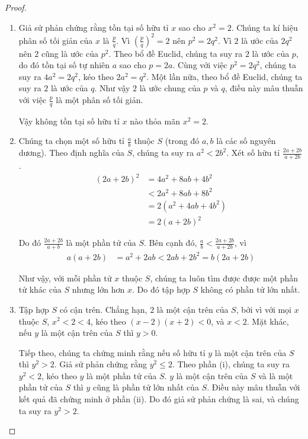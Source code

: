 \begin{proof}
	\begin{enumerate}[label={(\roman*)}]
		\item Giả sử phản chứng rằng tồn tại số hữu tỉ $x$ sao cho $x^{2} = 2$. Chúng ta kí hiệu phân số tối giản của $x$ là $\frac{p}{q}$. Vì ${\left(\frac{p}{q}\right)}^{2} = 2$ nên $p^{2} = 2q^{2}$. Vì $2$ là ước của $2q^{2}$ nên $2$ cũng là ước của $p^{2}$. Theo bổ đề Euclid, chúng ta suy ra $2$ là ước của $p$, do đó tồn tại số tự nhiên $a$ sao cho $p = 2a$. Cùng với việc $p^{2} = 2q^{2}$, chúng ta suy ra $4a^{2} = 2q^{2}$, kéo theo $2a^{2} = q^{2}$. Một lần nữa, theo bổ đề Euclid, chúng ta suy ra $2$ là ước của $q$. Như vậy $2$ là ước chung của $p$ và $q$, điều này mâu thuẫn với việc $\frac{p}{q}$ là một phân số tối giản.

		      Vậy không tồn tại số hữu tỉ $x$ nào thỏa mãn $x^{2} = 2$.
		\item Chúng ta chọn một số hữu tỉ $\frac{a}{b}$ thuộc $S$ (trong đó $a, b$ là các số nguyên dương). Theo định nghĩa của $S$, chúng ta suy ra $a^{2} < 2b^{2}$. Xét số hữu tỉ $\frac{2a + 2b}{a + 2b}$.
		      \begin{align*}
			      {(2a + 2b)}^{2} & = 4a^{2} + 8ab + 4b^{2}   \\
			                      & < 2a^{2} + 8ab + 8b^{2}   \\
			                      & = 2(a^{2} + 4ab + 4b^{2}) \\
			                      & = 2{(a + 2b)}^{2}
		      \end{align*}

		      Do đó $\frac{2a + 2b}{a + b}$ là một phần tử của $S$. Bên cạnh đó, $\frac{a}{b} < \frac{2a + 2b}{a + 2b}$, vì
		      \begin{align*}
			      a(a + 2b) & = a^{2} + 2ab < 2ab + 2b^{2} = b(2a + 2b)
		      \end{align*}

		      Như vậy, với mỗi phần tử $x$ thuộc $S$, chúng ta luôn tìm được được một phần tử khác của $S$ nhưng lớn hơn $x$. Do đó tập hợp $S$ không có phần tử lớn nhất.
		\item Tập hợp $S$ có cận trên. Chẳng hạn, $2$ là một cận trên của $S$, bởi vì với mọi $x$ thuộc $S$, $x^{2} < 2 < 4$, kéo theo $(x - 2)(x + 2) < 0$, và $x < 2$. Mặt khác, nếu $y$ là một cận trên của $S$ thì $y > 0$.

		      Tiếp theo, chúng ta chứng minh rằng nếu số hữu tỉ $y$ là một cận trên của $S$ thì $y^{2} > 2$. Giả sử phản chứng rằng $y^{2}\leq 2$. Theo phần (i), chúng ta suy ra $y^{2} < 2$, kéo theo $y$ là một phần tử của $S$. $y$ là một cận trên của $S$ và là một phần tử của $S$ thì $y$ cũng là phần tử lớn nhất của $S$. Điều này mâu thuẫn với kết quả đã chứng minh ở phần (ii). Do đó giả sử phản chứng là sai, và chúng ta suy ra $y^{2} > 2$.


\end{enumerate}
\end{proof}
